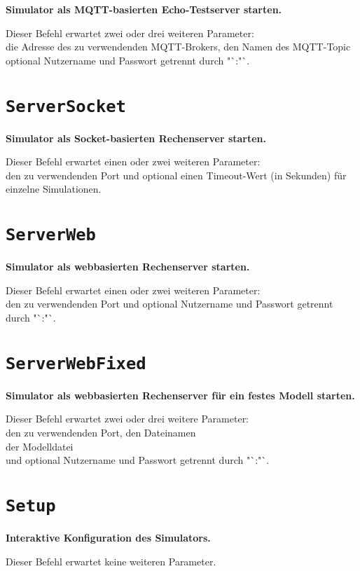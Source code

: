 \textbf{Simulator als MQTT-basierten Echo-Testserver starten.}

Dieser Befehl erwartet zwei oder drei weiteren Parameter:\\
die Adresse des zu verwendenden MQTT-Brokers, den Namen des MQTT-Topic optional Nutzername und Passwort getrennt durch "`:"`.

\section{\texttt{ServerSocket}}

\textbf{Simulator als Socket-basierten Rechenserver starten.}

Dieser Befehl erwartet einen oder zwei weiteren Parameter:\\
den zu verwendenden Port und optional einen Timeout-Wert (in Sekunden) für einzelne Simulationen.

\section{\texttt{ServerWeb}}

\textbf{Simulator als webbasierten Rechenserver starten.}

Dieser Befehl erwartet einen oder zwei weiteren Parameter:\\
den zu verwendenden Port und optional Nutzername und Passwort getrennt durch "`:"`.

\section{\texttt{ServerWebFixed}}

\textbf{Simulator als webbasierten Rechenserver für ein festes Modell starten.}

Dieser Befehl erwartet zwei oder drei weitere Parameter:\\
den zu verwendenden Port, den Dateinamen\\
der Modelldatei\\
und optional Nutzername und Passwort getrennt durch "`:"`.

\section{\texttt{Setup}}

\textbf{Interaktive Konfiguration des Simulators.}

Dieser Befehl erwartet keine weiteren Parameter.


